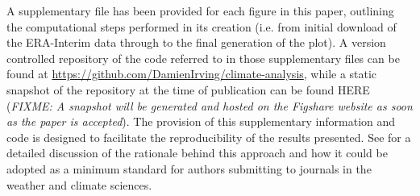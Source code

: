 A supplementary file has been provided for each figure in this paper, outlining the computational steps performed in its creation (i.e. from initial download of the ERA-Interim data through to the final generation of the plot). A version controlled repository of the code referred to in those supplementary files can be found at \url{https://github.com/DamienIrving/climate-analysis}, while a static snapshot of the repository at the time of publication can be found HERE (\textit{FIXME: A snapshot will be generated and hosted on the Figshare website as soon as the paper is accepted}). The provision of this supplementary information and code is designed to facilitate the reproducibility of the results presented. See \citet{Irving2016} for a detailed discussion of the rationale behind this approach and how it could be adopted as a minimum standard for authors submitting to journals in the weather and climate sciences. 